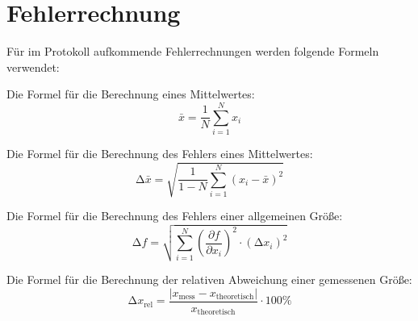 \section{Fehlerrechnung}
Für im Protokoll aufkommende Fehlerrechnungen werden folgende Formeln verwendet:

Die Formel für die Berechnung eines Mittelwertes:
\begin{equation}
    \bar{x}=\frac{1}{N}\sum^N_{i=1}x_i
    \label{eq:Mittelwert}
\end{equation}

Die Formel für die Berechnung des Fehlers eines Mittelwertes:
\begin{equation}
    \increment\bar{x} = \sqrt{\frac{1}{1-N}\sum^N_{i=1}\left(x_i-\bar{x}\right)^2}  
    \label{eq:MittelwertErr}
\end{equation}

Die Formel für die Berechnung des Fehlers einer allgemeinen Größe:
\begin{equation}
    \increment f=\sqrt{\sum^N_{i=1}\left(\frac{\partial f}{\partial x_i}\right)^2\cdot\left(\increment x_i\right)^2}
    \label{eq:Err}
\end{equation}

Die Formel für die Berechnung der relativen Abweichung einer gemessenen Größe:
\begin{equation}
    \increment x_\text{rel}=\frac{\lvert x_\text{mess}-x_\text{theoretisch}\rvert}{x_\text{theoretisch}}\cdot 100\%
    \label{eq:RelErr}
\end{equation}
\label{sec:Fehlerrechnung}
